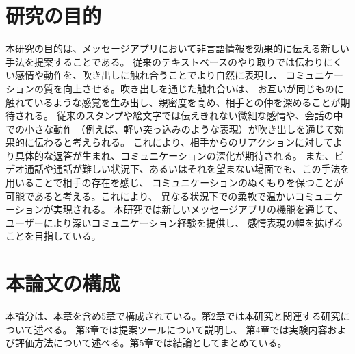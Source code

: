 \documentclass[11pt,a4paper]{ltjsreport}
\begin{document}
   \section{研究の目的}
		本研究の目的は、メッセージアプリにおいて非言語情報を効果的に伝える新しい手法を提案することである。
		従来のテキストベースのやり取りでは伝わりにくい感情や動作を、吹き出しに触れ合うことでより自然に表現し、
		コミュニケーションの質を向上させる。吹き出しを通じた触れ合いは、
		お互いが同じものに触れているような感覚を生み出し、親密度を高め、相手との仲を深めることが期待される。
		従来のスタンプや絵文字では伝えきれない微細な感情や、会話の中での小さな動作
	    （例えば、軽い突っ込みのような表現）が吹き出しを通じて効果的に伝わると考えられる。
		これにより、相手からのリアクションに対してより具体的な返答が生まれ、コミュニケーションの深化が期待される。
		また、ビデオ通話や通話が難しい状況下、あるいはそれを望まない場面でも、この手法を用いることで相手の存在を感じ、
		コミュニケーションのぬくもりを保つことが可能であると考える。これにより、
		異なる状況下での柔軟で温かいコミュニケーションが実現される。
		本研究では新しいメッセージアプリの機能を通じて、ユーザーにより深いコミュニケーション経験を提供し、
		感情表現の幅を拡げることを目指している。


   \section{本論文の構成}
	 本論分は、本章を含め5章で構成されている。第2章では本研究と関連する研究について述べる。
	 第3章では提案ツールについて説明し、
	 第4章では実験内容および評価方法について述べる。第5章では結論としてまとめている。

   
\end{document}
